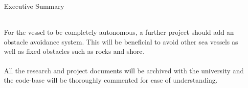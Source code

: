 \begin{Summary}{Executive Summary}
\begin{SumTable}
		\hline%
		\\
		\hline%
		For the vessel to be completely autonomous, a further project should add an obstacle avoidance system. This will be beneficial to avoid other sea vessels as well as fixed obstacles such as rocks and shore.\\
		
		\hline%
		\\
		\hline%
		All the research and project documents will be archived with the university and the code-base will be thoroughly commented for ease of understanding.\\
		
		\hline%
	\end{SumTable}
	
	
	\vspace{1.5cm}
	\SumSignatures
	
\end{Summary}

\endinput
